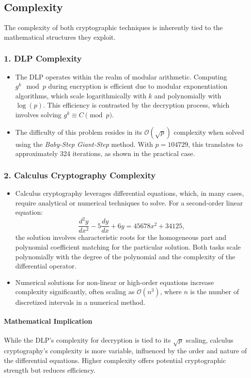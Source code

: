 \documentclass[12pt]{article}
\begin{document}
\subsection*{Complexity}

The complexity of both cryptographic techniques is inherently tied to the mathematical structures they exploit.

\subsubsection*{1. DLP Complexity}
\begin{itemize}
    \item The DLP operates within the realm of modular arithmetic. Computing \( g^k \mod p \) during encryption is efficient due to modular exponentiation algorithms, which scale logarithmically with \( k \) and polynomially with \( \log(p) \). This efficiency is contrasted by the decryption process, which involves solving \( g^k \equiv C \pmod{p} \).
    \item The difficulty of this problem resides in its \( \mathcal{O}(\sqrt{p}) \) complexity when solved using the \textit{Baby-Step Giant-Step} method. With \( p = 104729 \), this translates to approximately 324 iterations, as shown in the practical case.
\end{itemize}

\subsubsection*{2. Calculus Cryptography Complexity}
\begin{itemize}
    \item Calculus cryptography leverages differential equations, which, in many cases, require analytical or numerical techniques to solve. For a second-order linear equation:
    \[
    \frac{d^2y}{dx^2} - 5\frac{dy}{dx} + 6y = 45678x^2 + 34125,
    \]
    the solution involves characteristic roots for the homogeneous part and polynomial coefficient matching for the particular solution. Both tasks scale polynomially with the degree of the polynomial and the complexity of the differential operator.
    \item Numerical solutions for non-linear or high-order equations increase complexity significantly, often scaling as \( \mathcal{O}(n^3) \), where \( n \) is the number of discretized intervals in a numerical method.
\end{itemize}

\paragraph*{Mathematical Implication}
While the DLP’s complexity for decryption is tied to its \( \sqrt{p} \) scaling, calculus cryptography’s complexity is more variable, influenced by the order and nature of the differential equations. Higher complexity offers potential cryptographic strength but reduces efficiency.
\end{document}
